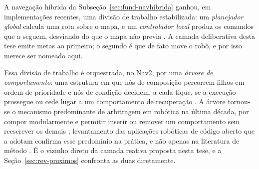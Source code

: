 A navegação híbrida da Subseção~\ref{sec:fund-navhibrida} ganhou, em implementações
recentes, uma divisão de trabalho estabilizada: um \emph{planejador global} calcula uma
rota sobre o mapa, e um \emph{controlador local} produz os comandos que a seguem,
desviando do que o mapa não previa \cite{Macenski2020Marathon}. A camada deliberativa
desta tese emite metas ao primeiro; o segundo é que de fato move o robô, e por isso
merece ser nomeado aqui.

Essa divisão de trabalho é orquestrada, no Nav2, por uma \emph{árvore de comportamento}:
uma estrutura em que nós de composição percorrem filhos em ordem de prioridade e nós de
condição decidem, a cada tique, se a execução prossegue ou cede lugar a um comportamento
de recuperação \cite{Colledanchise2018BT, Macenski2020Marathon}. A árvore tornou-se o
mecanismo predominante de arbitragem em robótica na última década, por compor
modularmente e permitir inserir ou remover um comportamento sem reescrever os demais
\cite{Iovino2022BTSurvey}; levantamento das aplicações robóticas de código aberto que a
adotam confirma esse predomínio na prática, e não apenas na literatura de método
\cite{Ghzouli2020BTAction}. É o vizinho direto da camada reativa proposta nesta tese, e a
Seção~\ref{sec:rev-proximos} confronta as duas diretamente.

